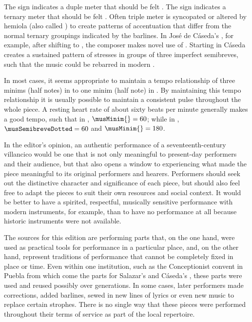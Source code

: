 The sign \meterC{} indicates a duple meter that should be felt .
The sign \meterCThree{} indicates a ternary meter that should be felt
.
Often triple meter is syncopated or altered by hemiola (also called
) to create patterns of accentuation that differ from the
normal ternary groupings indicated by the barlines.
In José de Cáseda's , for example, after shifting
to \meterCThree{}, the composer makes novel use of .
Starting in  Cáseda creates a sustained pattern of stresses in
groups of three imperfect semibreves, such that the music could be rebarred in
modern .

In most cases, it seems appropriate to maintain a tempo relationship of three
minims (half notes) in \meterCThree{} to one minim (half note) in \meterC{}.
By maintaining this tempo relationship it is usually possible to maintain a
consistent pulse throughout the whole piece.
A resting heart rate of about sixty beats per minute generally makes a good
tempo, such that in \meterC{}, $\musMinim{} = 60$; while in \meterCThree,
$\musSemibreveDotted = 60$ and $\musMinim{} = 180$.


In the editor's opinion, an authentic performance of a seventeenth-century
villancico would be one that is not only meaningful to present-day performers
and their audience, but that also opens a window to experiencing what made the
piece meaningful to its original performers and hearers.
Performers should seek out the distinctive character and significance of each
piece, but should also feel free to adapt the pieces to suit their own resources
and social context.
It would be better to have a spirited, respectful, musically sensitive
performance with modern instruments, for example, than to have no performance
at all because historic instruments were not available.

The sources for this edition are performing parts that, on the one hand,
were used as practical tools for performance in a particular place, and, on the
other hand, represent traditions of performance that cannot be completely fixed
in place or time.
Even within one institution, such as the Conceptionist convent in Puebla from
which come the parts for Salazar's  and Cáseda's
, these parts were used and reused possibly over
generations. 
In some cases, later performers made corrections, added barlines, sewed in new
lines of lyrics or even new music to replace certain strophes.
There is no single way that these pieces were performed throughout their terms
of service as part of the local repertoire.

